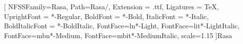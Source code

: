
\setlength{\headheight}{17.12pt}
\setlength{\parskip}{.25ex}
\pagestyle{fancy}
\renewcommand{\headrulewidth}{1pt}
\renewcommand{\footrulewidth}{1pt}

\renewcommand\headrule{%
\vspace{-6pt}
\hrulefill
\raisebox{-2.1pt}
{\quad\decofourleft\decosix\decofourright\quad}%
\hrulefill}

\fancyhf[CF]{}

\newfontfamily{\Rasa}[
  NFSSFamily=Rasa,
  Path={Rasa/},
  Extension = .ttf,
  Ligatures = TeX,
  UprightFont = *-Regular,
  BoldFont = *-Bold,
  ItalicFont = *-Italic,
  BoldItalicFont = *-BoldItalic,
  FontFace={l}{n}{*-Light},
  FontFace={l}{it}{*-LightItalic},
  FontFace={mb}{n}{*-Medium},
  FontFace={mb}{it}{*-MediumItalic},
  scale=1.15
]{Rasa}

\renewcommand{\familydefault}{Rasa}%

\titleformat{\section}{\bfseries\centering\Large}{}{0em}{}
\titleformat{\subsection}{\bfseries\centering\large}{}{0em}{}

